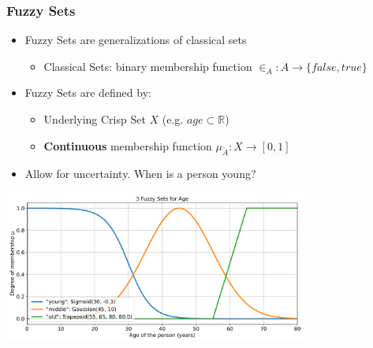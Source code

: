 \documentclass[
	10pt,
	t		%
]{beamer}
\begin{document}
\begin{frame}
	\frametitle{Fuzzy Sets}
	\begin{itemize}
		\item Fuzzy Sets are generalizations of classical sets
		      \begin{itemize}
			      \item Classical Sets: binary membership function $\in_A : A \rightarrow \{false, true\}$
		      \end{itemize}
		\item Fuzzy Sets are defined by:
		      \begin{itemize}
			      \item Underlying Crisp Set $X$ (e.g. $age \subset \mathbb{R}$)
			      \item \textbf{Continuous} membership function $\mu_{\tilde{A}} : X  \rightarrow [0,1]$
		      \end{itemize}
		\item Allow for uncertainty. When is a person young?
	\end{itemize}
	\begin{center}
		\includegraphics[width=0.75\textwidth,trim={0 0 0 0.85cm},clip]{figures/age-fuzzy-sets.png}
	\end{center}
\end{frame}
\end{document}
